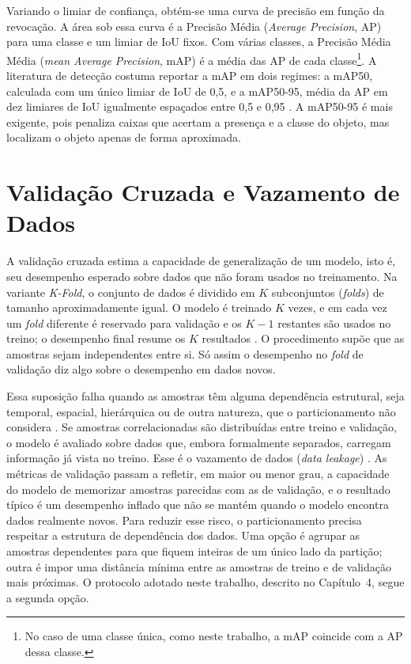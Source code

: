 Variando o limiar de confiança, obtém-se uma curva de precisão em função da revocação. A área sob essa curva é a Precisão Média (\textit{Average Precision}, AP) para uma classe e um limiar de IoU fixos. Com várias classes, a Precisão Média Média (\textit{mean Average Precision}, mAP) é a média das AP de cada classe\footnote{No caso de uma classe única, como neste trabalho, a mAP coincide com a AP dessa classe.}. A literatura de detecção costuma reportar a mAP em dois regimes: a mAP50, calculada com um único limiar de IoU de 0,5, e a mAP50-95, média da AP em dez limiares de IoU igualmente espaçados entre 0,5 e 0,95 \cite{journals/corr/LinMBHPRDZ14}. A mAP50-95 é mais exigente, pois penaliza caixas que acertam a presença e a classe do objeto, mas localizam o objeto apenas de forma aproximada.

\section{Validação Cruzada e Vazamento de Dados}
\label{sec:validacao-cruzada-vazamento}

A validação cruzada estima a capacidade de generalização de um modelo, isto é, seu desempenho esperado sobre dados que não foram usados no treinamento. Na variante \textit{K-Fold}, o conjunto de dados é dividido em $K$ subconjuntos (\textit{folds}) de tamanho aproximadamente igual. O modelo é treinado $K$ vezes, e em cada vez um \textit{fold} diferente é reservado para validação e os $K-1$ restantes são usados no treino; o desempenho final resume os $K$ resultados \cite{kohavi1995study}. O procedimento supõe que as amostras sejam independentes entre si. Só assim o desempenho no \textit{fold} de validação diz algo sobre o desempenho em dados novos.

Essa suposição falha quando as amostras têm alguma dependência estrutural, seja temporal, espacial, hierárquica ou de outra natureza, que o particionamento não considera \cite{roberts2017crossvalidation}. Se amostras correlacionadas são distribuídas entre treino e validação, o modelo é avaliado sobre dados que, embora formalmente separados, carregam informação já vista no treino. Esse é o vazamento de dados (\textit{data leakage}) \cite{kaufman2012leakage}. As métricas de validação passam a refletir, em maior ou menor grau, a capacidade do modelo de memorizar amostras parecidas com as de validação, e o resultado típico é um desempenho inflado que não se mantém quando o modelo encontra dados realmente novos. Para reduzir esse risco, o particionamento precisa respeitar a estrutura de dependência dos dados. Uma opção é agrupar as amostras dependentes para que fiquem inteiras de um único lado da partição; outra é impor uma distância mínima entre as amostras de treino e de validação mais próximas. O protocolo adotado neste trabalho, descrito no Capítulo~4, segue a segunda opção.

